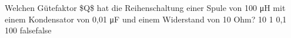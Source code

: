     {Welchen Gütefaktor \$Q\$ hat die Reihenschaltung einer Spule von 100 μH mit einem Kondensator von 0,01 μF und einem Widerstand von 10 Ohm?}
    {10}
    {1}
    {0,1}
    {100}
    {false}{false}